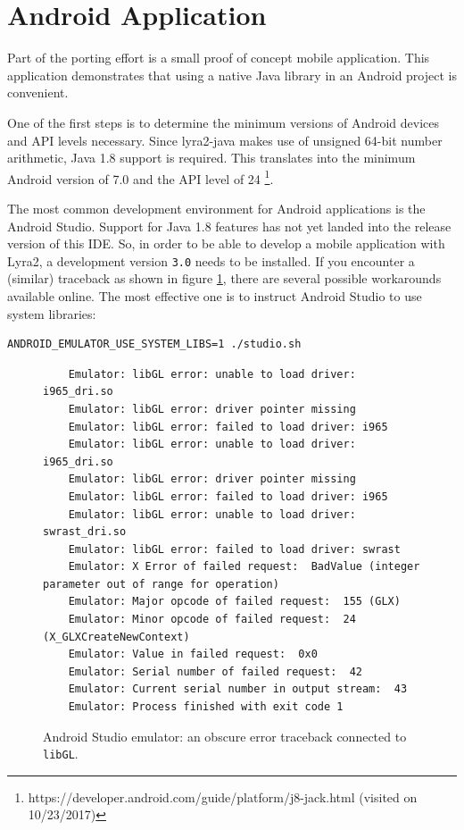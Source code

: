 \section{Android Application}
\label{sec:mobile-application}

Part of the porting effort is a small proof of concept mobile application. This application demonstrates that using a native Java library in an Android project is convenient.

One of the first steps is to determine the minimum versions of Android devices and API levels necessary. Since lyra2-java makes use of unsigned 64-bit number arithmetic, Java 1.8 support is required. This translates into the minimum Android version of 7.0 and the API level of 24 \footnote{https://developer.android.com/guide/platform/j8-jack.html (visited on 10/23/2017)}.

The most common development environment for Android applications is the Android Studio. Support for Java 1.8 features has not yet landed into the release version of this IDE. So, in order to be able to develop a mobile application with Lyra2, a development version \texttt{3.0} needs to be installed. If you encounter a (similar) traceback as shown in figure \ref{fig:traceback}, there are several possible workarounds available online. The most effective one is to instruct Android Studio to use system libraries:

\begin{verbatim}
ANDROID_EMULATOR_USE_SYSTEM_LIBS=1 ./studio.sh
  \end{verbatim}

\begin{figure}
\begin{verbatim}
    Emulator: libGL error: unable to load driver: i965_dri.so
    Emulator: libGL error: driver pointer missing
    Emulator: libGL error: failed to load driver: i965
    Emulator: libGL error: unable to load driver: i965_dri.so
    Emulator: libGL error: driver pointer missing
    Emulator: libGL error: failed to load driver: i965
    Emulator: libGL error: unable to load driver: swrast_dri.so
    Emulator: libGL error: failed to load driver: swrast
    Emulator: X Error of failed request:  BadValue (integer parameter out of range for operation)
    Emulator: Major opcode of failed request:  155 (GLX)
    Emulator: Minor opcode of failed request:  24 (X_GLXCreateNewContext)
    Emulator: Value in failed request:  0x0
    Emulator: Serial number of failed request:  42
    Emulator: Current serial number in output stream:  43
    Emulator: Process finished with exit code 1
\end{verbatim}
\caption{Android Studio emulator: an obscure error traceback connected to \texttt{libGL}.}
\label{fig:traceback}
\end{figure}

